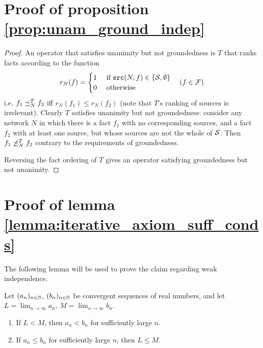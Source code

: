 \documentclass[../main.tex]{subfiles}
\begin{document}
\section{Proof of proposition \ref{prop:unam_ground_indep}}
\begin{proof}

An operator that satisfies unanimity but not groundedness is $T$ that ranks
facts according to the function
$$
    r_N(f) = \begin{cases}
        1 & \text{ if } \src(N, f) \in \{\S, \emptyset\} \\
        0 & \text{ otherwise}
    \end{cases}
    \quad (f \in \F)
$$
i.e. $f_1 \fle_N^T f_2$ iff $r_N(f_1) \le r_N(f_2)$ (note that $T$'s ranking of
sources is irrelevant). Clearly $T$ satisfies unanimity but not groundedness:
consider any network $N$ in which there is a fact $f_1$ with no corresponding
sources, and a fact $f_2$ with at least one source, but whose sources are not
the whole of $\S$. Then $f_1 \not\fle_N^T f_2$ contrary to the requirements of
groundedness.

Reversing the fact ordering of $T$ gives an operator satisfying groundedness
but not unanimity.

\end{proof}

\section{Proof of lemma \ref{lemma:iterative_axiom_suff_conds}}

The following lemma will be used to prove the claim regarding weak
independence.

\begin{lemma}
\label{lemma:sequence_lemma}

Let $(a_n)_{n \in \Nat}$, $(b_n)_{n \in \Nat}$ be convergent sequences of real
numbers, and let $L = \lim_{n \rightarrow \infty}a_n$, $M = \lim_{n \rightarrow
\infty}b_n$.
\begin{enumerate}
    \item If $L < M$, then $a_n < b_n$ for sufficiently large $n$.
    \item If $a_n \le b_n$ for sufficiently large $n$, then $L \le M$.
\end{enumerate}
\end{lemma}
\end{document}
